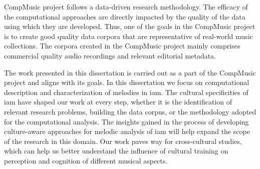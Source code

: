 CompMusic project follows a data-driven research methodology. The efficacy of the computational approaches are directly impacted by the quality of the data using which they are developed. Thus, one of the goals in the CompMusic project is to create good quality data corpora that are representative of real-world music collections. The corpora created in the CompMusic project mainly comprises commercial quality audio recordings and relevant editorial metadata. 

The work presented in this dissertation is carried out as a part of the CompMusic project and aligns with its goals. In this dissertation we focus on computational description and characterization of melodies in \gls{iam}. The cultural specificities of \gls{iam} have shaped our work at every step, whether it is the identification of relevant research problems, building the data corpus, or the methodology adopted for the computational analysis. The insights gained in the process of developing culture-aware approaches for melodic analysis of \gls{iam} will help expand the scope of the research in this domain. Our work paves way for cross-cultural studies, which can help us better understand the influence of cultural training on perception and cognition of different musical aspects. 



